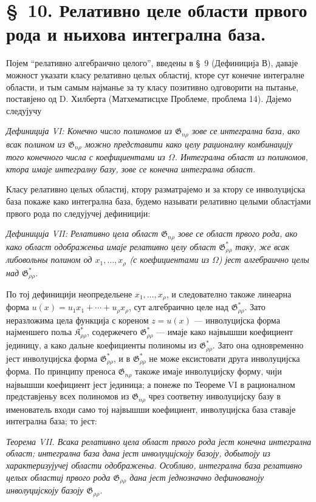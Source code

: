 ﻿\documentclass[11pt]{article}
\providecommand{\Kfield}{\mathfrak{K}}
\providecommand{\Gdom}{\mathfrak{G}}
\begin{document}
\section*{\S\ 10. Релативно целе области првого рода и ньихова интегрална база.}

Појем ``релативно алгебраично целого'', введены в \S\ 9 (Дефиниција В), даваје можност указати класу релативно целых областиј, кторе сут конечне интегралне области, и тым самым најманье за ту класу позитивно одговорити на пытанье, поставјено од D. Хилберта (Матхематисцхе Проблеме, проблема 14). Дајемо следујучу

{\itshape Дефиниција VI: Конечно число полиномов из $\Gdom_{n\rho}$ зове се интегрална база, ако всак полином из $\Gdom_{n\rho}$ можно представити како целу рационалну комбинацију того конечного числа с коефициентами из $\Omega$. Интегрална област из полиномов, ктора имаје интегралну базу, зове се конечна интегрална област.}

Класу релативно целых областиј, ктору разматрајемо и за ктору се инволуцијска база покаже како интегрална база, будемо называти релативно целыми областјами првого рода по следујучеј дефиницији:

{\itshape Дефиниција VII: Релативно цела област $\Gdom_{n\rho}$ зове се област првого рода, ако како област одображеньа имаје релативно целу област $\Gdom^*_{\rho\rho}$ таку, же всак либовольны полином од $x_1,\ldots,x_\rho$ (с коефициентами из $\Omega$) јест алгебраично целы над $\Gdom^*_{\rho\rho}$.}

По тој дефиницији неопредельене $x_1,\ldots,x_\rho$, и следователно такоже линеарна форма $u(x)=u_1x_1+\cdots+u_\rho x_\rho$, сут алгебраично целе над $\Gdom^*_{\rho\rho}$. Зато неразложима цела функција с кореном $z=u(x)$ --- инволуцијска форма најменшего польа $\Kfield^*_{\rho\rho}$, содержечего $\Gdom^*_{\rho\rho}$ --- имаје како највышши коефициент јединицу, а како дальне коефициенты полиномы из $\Gdom^*_{\rho\rho}$. Зато она одновременно јест инволуцијска форма $\Gdom^*_{\rho\rho}$, и в $\Gdom^*_{\rho\rho}$ не може ексистовати друга инволуцијска форма. По принципу преноса $\Gdom_{n\rho}$ такоже имаје инволуцијску форму, чији највышши коефициент јест јединица; а понеже по Теореме VI в рационалном представјеньу всех полиномов из $\Gdom_{n\rho}$ чрез соответну инволуцијску базу в именователь входи само тој највышши коефициент, инволуцијска база ставаје интегрална база; то јест:

{\itshape Теорема VII. Всака релативно цела област првого рода јест конечна интегрална област; интегрална база дана јест инволуцијскоју базоју, добытоју из характеризујучеј области одображеньа. Особливо, интегрална база релативно целых областиј првого рода $\Gdom_{\rho\rho}$ дана јест једнозначно дефинованоју инволуцијскоју базоју $\Gdom_{\rho\rho}$.}
\end{document}
